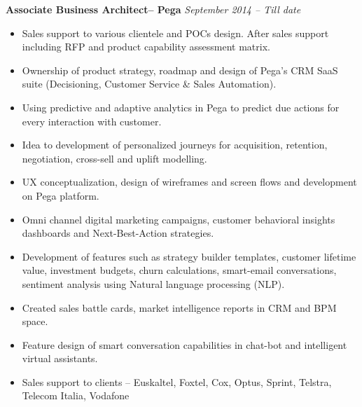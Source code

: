 \documentclass[line, margin]{res}
\begin{document}
\begin{resume}
	{\bf Associate Business Architect\-– Pega}  \hspace{5ex} {\em September 2014 – Till date}\\
	\begin{itemize}
		\item Sales support to various clientele and POCs design. After sales support including RFP and product capability assessment matrix.
		\item Ownership of product strategy, roadmap and design of Pega’s CRM SaaS suite (Decisioning, Customer Service \& Sales Automation).
		\item Using predictive and adaptive analytics in Pega to predict due actions for every interaction with customer.
		\item Idea to development of personalized journeys for acquisition, retention, negotiation, cross-sell and uplift modelling.
		\item UX conceptualization, design of wireframes and screen flows and development on Pega platform.
		\item Omni channel digital marketing campaigns, customer behavioral insights dashboards and Next-Best-Action strategies.
		\item Development of features such as strategy builder templates, customer lifetime value, investment budgets, churn calculations, smart-email conversations, sentiment analysis using 	Natural language processing (NLP).
		\item Created sales battle cards, market intelligence reports in CRM and BPM space.
		\item Feature design of smart conversation capabilities in chat-bot and intelligent virtual assistants.
		\item Sales support to clients – Euskaltel, Foxtel, Cox, Optus, Sprint, Telstra, Telecom Italia, Vodafone
	\end{itemize}
		

\end{resume}
\end{document}
